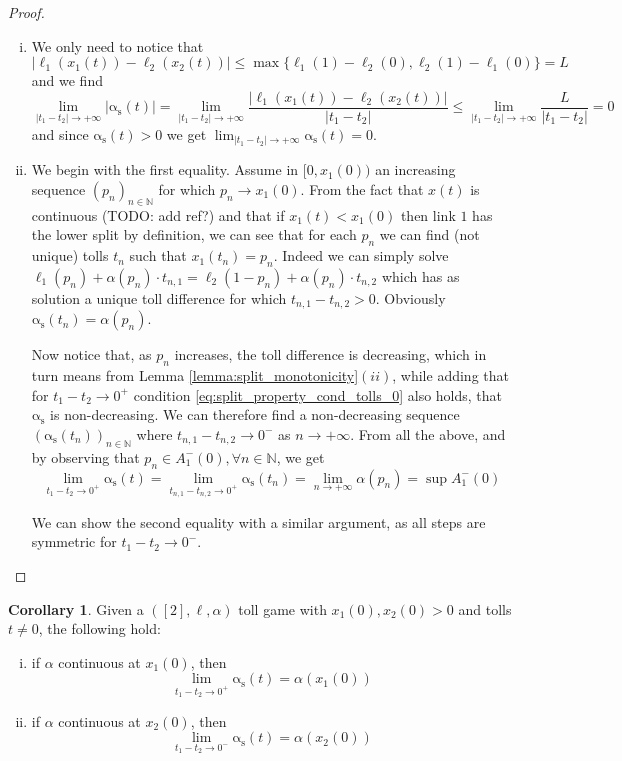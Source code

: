 \documentclass[10pt,a4paper]{book}
\newcommand{\as}{\mathrm{\alpha_s}}
\theoremstyle{definition}
\newtheorem{corollary}[definition]{Corollary}
\theoremstyle{comment}
\begin{document}
\begin{proof}
	$ $
	\begin{enumerate}[(i)]
		\item We only need to notice that
		\[|\ell_1(x_1(t)) - \ell_2(x_2(t))| \le \max\{\ell_1(1) - \ell_2(0), \ell_2(1) - \ell_1(0)\} = L\]
		and we find
		\[\lim_{|t_1 - t_2| \rightarrow +\infty}|\as(t)| = \lim_{|t_1 - t_2| \rightarrow +\infty}\frac{|\ell_1(x_1(t)) - \ell_2(x_2(t))|}{|t_1 - t_2|} \le \lim_{|t_1 - t_2| \rightarrow +\infty}\frac{L}{|t_1 - t_2|} = 0\]
		and since $\as(t) > 0$ we get $\lim_{|t_1 - t_2| \rightarrow +\infty}\as(t) = 0$.
		\item We begin with the first equality.
		Assume in $[0, x_1(0))$ an increasing sequence $(p_n)_{n \in \mathbb{N}}$ for which $p_n \rightarrow x_1(0)$.
		From the fact that $x(t)$ is continuous (TODO: add ref?) and that if $x_1(t) < x_1(0)$ then link $1$ has the lower split by definition, we can see that for each $p_n$ we can find (not unique) tolls $t_n$ such that $x_1(t_n) = p_n$.
		Indeed we can simply solve $\ell_1(p_n) + \alpha(p_n) \cdot t_{n, 1} = \ell_2(1 - p_n) + \alpha(p_n) \cdot t_{n, 2}$ which has as solution a unique toll difference for which $t_{n, 1} - t_{n, 2} > 0$.
		Obviously $\as(t_n) = \alpha(p_n)$.

		Now notice that, as $p_n$ increases, the toll difference is decreasing, which in turn means from Lemma \ref{lemma:split_monotonicity}$(ii)$, while adding that for $t_1 - t_2 \rightarrow 0^+$ condition \ref{eq:split_property_cond_tolls_0} also holds, that $\as$ is non-decreasing.
		We can therefore find a non-decreasing sequence $(\as(t_n))_{n \in \mathbb{N}}$ where $t_{n, 1} - t_{n, 2} \rightarrow 0^-$ as $n \rightarrow +\infty$.
		From all the above, and by observing that $p_n \in A_1^-(0), \forall n \in \mathbb{N}$, we get
		\[\lim_{t_1 - t_2 \rightarrow 0^+}\as(t) = \lim_{t_{n, 1} - t_{n, 2} \rightarrow 0^+}\as(t_n) = \lim_{n \rightarrow +\infty}\alpha(p_n) = \sup A_1^-(0) \]

		We can show the second equality with a similar argument, as all steps are symmetric for $t_1 - t_2 \rightarrow 0^-$.
	\end{enumerate}
\end{proof}

\begin{corollary}
	\label{corollary:split_asymptotic_continuous}
	Given a $([2], \ell, \alpha)$ toll game with $x_1(0), x_2(0) > 0$ and tolls $t \ne 0$, the following hold:
	\begin{enumerate}[(i)]
		\item if $\alpha$ continuous at $x_1(0)$, then
		\[\lim_{t_1 - t_2 \rightarrow 0^+} \as(t) = \alpha(x_1(0))\]
		\item if $\alpha$ continuous at $x_2(0)$, then
		\[\lim_{t_1 - t_2 \rightarrow 0^-} \as(t) = \alpha(x_2(0))\]
	\end{enumerate}
\end{corollary}
\end{document}
